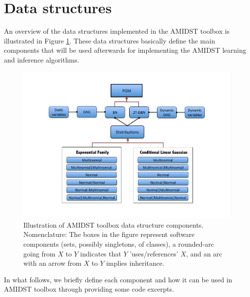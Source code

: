 \section{Data structures} \label{sec:DataStructures}

An overview of the data structures implemented in the AMIDST toolbox is illustrated in Figure \ref{Figure:ToolboxDataStructures}. These data structures basically define the main components that will be used afterwards for implementing the AMIDST learning and inference algorithms. 

\vspace{-0.1in}

\begin{figure}[ht!]
\begin{center}
\includegraphics[width=\linewidth]{./figures/DataStructure}
\vspace{-0.5in}
\caption{\label{Figure:ToolboxDataStructures} Illustration of AMIDST toolbox data structure components. Nomenclature: The boxes in the
      figure represent software components (sets, possibly singletons, of classes), a rounded-arc going from $X$ to $Y$ indicates that $Y$ 'uses/references' $X$, and an arc with an arrow from $X$ to $Y$ implies inheritance.}
\end{center}
\end{figure}

In what follows, we briefly define each component and how it can be used in AMIDST toolbox through providing some code excerpts. 


